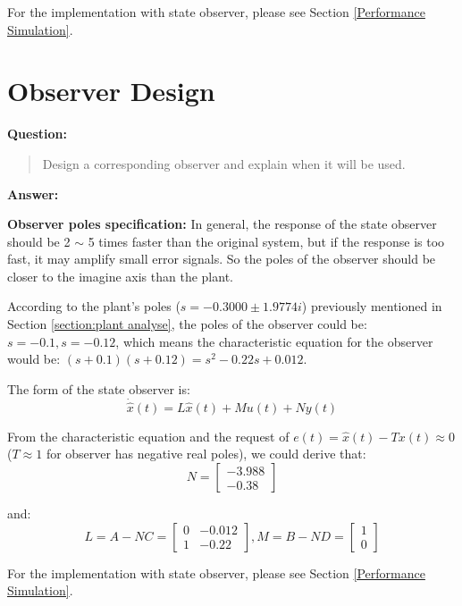 \documentclass[12pt, oneside]{article}
\begin{document}
For the implementation with state observer, please see Section \ref{Performance Simulation}.


\section{Observer Design}
\textbf{Question:}
\begin{quote}
Design a corresponding observer and explain when it will be used. 
\end{quote}
\textbf{Answer:}

\textbf{Observer poles specification:} In general, the response of the state observer should be 2 $\sim$ 5 times faster than the original system\cite{CourseMaterial}, but if the response is too fast, it may amplify small error signals. So the poles of the observer should be closer to the imagine axis than the plant.

According to the plant's poles ($s = -0.3000\pm1.9774i$) previously mentioned in Section \ref{section:plant analyse}, the poles of the observer could be: $s=-0.1, s=-0.12$, which means the characteristic equation for the observer would be: $(s+0.1)(s+0.12)=s^2-0.22s+0.012$.

The form of the state observer is:
\begin{equation}
    \dot{\hat{x}}(t) = L\hat{x}(t)+Mu(t)+Ny(t)
\end{equation}

From the characteristic equation and the request of $e(t) = \hat{x}(t)-Tx(t) \approx 0$ ($T \approx 1$ for observer has negative real poles), we could derive that:
\begin{equation}
    N = 
    \left[\begin{array}{ccc}-3.988\\-0.38\end{array}\right]
\end{equation}

and:
\begin{equation}
    L = A-NC = \left[\begin{array}{ccc}0&-0.012\\1&-0.22\end{array}\right], 
    M = B-ND = \left[\begin{array}{ccc}1\\0\end{array}\right]
\end{equation}

For the implementation with state observer, please see Section \ref{Performance Simulation}.
\end{document}
